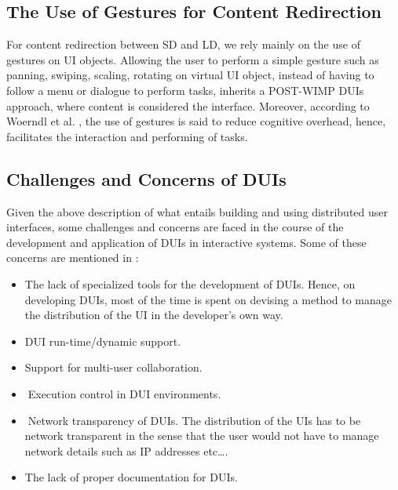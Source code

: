 \subsection{The Use of Gestures for Content Redirection}
For content redirection between SD and LD, we rely mainly on the use of
gestures on UI objects. Allowing the user to perform a simple gesture such as
panning, swiping, scaling, rotating on virtual UI object, instead of having to
follow a menu or dialogue to perform tasks, inherits a POST-WIMP DUIs
approach, where content is considered the interface. Moreover, according to
Woerndl et al. \cite{woerndl2012combining}, the use of gestures is said to
reduce cognitive overhead, hence, facilitates the interaction and performing of
tasks.
\subsection{Challenges and Concerns of DUIs}
Given the above description of what entails building and using
distributed user interfaces, some challenges and concerns are faced
in the course of the development and application of DUIs in interactive systems.
Some of these concerns are mentioned in \cite{melchior2011distributed}: 
\begin{itemize}
\item The lack of specialized tools for the development of 
 DUIs. Hence, on developing DUIs, most of the time is spent on
 devising a method to manage the distribution of the UI in the
 developer's own way. 
\item DUI run-time/dynamic support.
\item Support for multi-user collaboration.
\item 􏰀Execution control in DUI environments.
\item 􏰀Network transparency of DUIs. The distribution of the UIs has to be
network transparent in the sense that the user would not have to manage
network details such as IP addresses etc\ldots.
\item The lack of proper documentation for DUIs.
\end{itemize}


